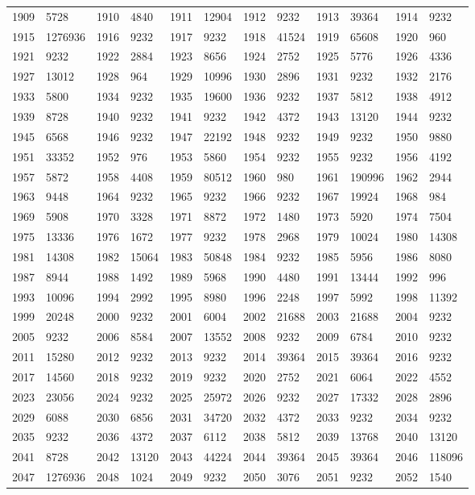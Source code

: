 \begin{longtable}{llllllllllll}
1909 & 5728&1910 &4840&1911& 12904&1912 &9232&1913 &39364&1914& 9232\\
1915 & 1276936&1916 &9232&1917& 9232&1918 &41524&1919 &65608&1920& 960\\
1921 & 9232&1922 &2884&1923& 8656&1924 &2752&1925 &5776&1926& 4336\\
1927 & 13012&1928 &964&1929& 10996&1930 &2896&1931 &9232&1932& 2176\\
1933 & 5800&1934 &9232&1935& 19600&1936 &9232&1937 &5812&1938& 4912\\
1939 & 8728&1940 &9232&1941& 9232&1942 &4372&1943 &13120&1944& 9232\\
1945 & 6568&1946 &9232&1947& 22192&1948 &9232&1949 &9232&1950& 9880\\
1951 & 33352&1952 &976&1953& 5860&1954 &9232&1955 &9232&1956& 4192\\
1957 & 5872&1958 &4408&1959& 80512&1960 &980&1961 &190996&1962& 2944\\
1963 & 9448&1964 &9232&1965& 9232&1966 &9232&1967 &19924&1968& 984\\
1969 & 5908&1970 &3328&1971& 8872&1972 &1480&1973 &5920&1974& 7504\\
1975 & 13336&1976 &1672&1977& 9232&1978 &2968&1979 &10024&1980& 14308\\
1981 & 14308&1982 &15064&1983& 50848&1984 &9232&1985 &5956&1986& 8080\\
1987 & 8944&1988 &1492&1989& 5968&1990 &4480&1991 &13444&1992& 996\\
1993 & 10096&1994 &2992&1995& 8980&1996 &2248&1997 &5992&1998& 11392\\
1999 & 20248&2000 &9232&2001& 6004&2002 &21688&2003 &21688&2004& 9232\\
2005 & 9232&2006 &8584&2007& 13552&2008 &9232&2009 &6784&2010& 9232\\
2011 & 15280&2012 &9232&2013& 9232&2014 &39364&2015 &39364&2016& 9232\\
2017 & 14560&2018 &9232&2019& 9232&2020 &2752&2021 &6064&2022& 4552\\
2023 & 23056&2024 &9232&2025& 25972&2026 &9232&2027 &17332&2028& 2896\\
2029 & 6088&2030 &6856&2031& 34720&2032 &4372&2033 &9232&2034& 9232\\
2035 & 9232&2036 &4372&2037& 6112&2038 &5812&2039 &13768&2040& 13120\\
2041 & 8728&2042 &13120&2043& 44224&2044 &39364&2045 &39364&2046& 118096\\
2047 & 1276936&2048 &1024&2049& 9232&2050 &3076&2051 &9232&2052& 1540\\

\end{longtable}
